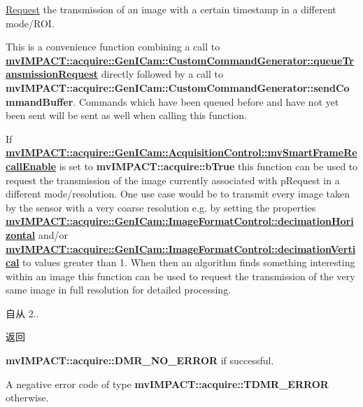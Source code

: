 \hyperlink{classmv_i_m_p_a_c_t_1_1acquire_1_1_request}{Request} the transmission of an image with a certain timestamp in a different mode/\+R\+O\+I. 

This is a convenience function combining a call to {\bfseries \hyperlink{classmv_i_m_p_a_c_t_1_1acquire_1_1_gen_i_cam_1_1_custom_command_generator_a807c3f7b8eb9b6392035e97967116250}{mv\+I\+M\+P\+A\+C\+T\+::acquire\+::\+Gen\+I\+Cam\+::\+Custom\+Command\+Generator\+::queue\+Transmission\+Request}} directly followed by a call to {\bfseries mv\+I\+M\+P\+A\+C\+T\+::acquire\+::\+Gen\+I\+Cam\+::\+Custom\+Command\+Generator\+::send\+Command\+Buffer}. Commands which have been queued before and have not yet been sent will be sent as well when calling this function.

If {\bfseries \hyperlink{classmv_i_m_p_a_c_t_1_1acquire_1_1_gen_i_cam_1_1_acquisition_control_aeb86056e3eb76d5c80c4048ac9ba10d5}{mv\+I\+M\+P\+A\+C\+T\+::acquire\+::\+Gen\+I\+Cam\+::\+Acquisition\+Control\+::mv\+Smart\+Frame\+Recall\+Enable}} is set to {\bfseries mv\+I\+M\+P\+A\+C\+T\+::acquire\+::b\+True} this function can be used to request the transmission of the image currently associated with {\ttfamily p\+Request} in a different mode/resolution. One use case would be to transmit every image taken by the sensor with a very coarse resolution e.\+g. by setting the properties {\bfseries \hyperlink{classmv_i_m_p_a_c_t_1_1acquire_1_1_gen_i_cam_1_1_image_format_control_af3c2ae5e5f9aaea7a762f3cd10ce1ebb}{mv\+I\+M\+P\+A\+C\+T\+::acquire\+::\+Gen\+I\+Cam\+::\+Image\+Format\+Control\+::decimation\+Horizontal}} and/or {\bfseries \hyperlink{classmv_i_m_p_a_c_t_1_1acquire_1_1_gen_i_cam_1_1_image_format_control_aee18567f6502e019607cab86903a68af}{mv\+I\+M\+P\+A\+C\+T\+::acquire\+::\+Gen\+I\+Cam\+::\+Image\+Format\+Control\+::decimation\+Vertical}} to values greater than 1. When then an algorithm finds something interesting within an image this function can be used to request the transmission of the very same image in full resolution for detailed processing.

\begin{DoxySince}{自从}
2.. 
\end{DoxySince}
\begin{DoxyReturn}{返回}

\begin{DoxyItemize}
\item {\bfseries mv\+I\+M\+P\+A\+C\+T\+::acquire\+::\+D\+M\+R\+\_\+\+N\+O\+\_\+\+E\+R\+R\+O\+R} if successful.
\item A negative error code of type {\bfseries mv\+I\+M\+P\+A\+C\+T\+::acquire\+::\+T\+D\+M\+R\+\_\+\+E\+R\+R\+O\+R} otherwise. 
\end{DoxyItemize}
\end{DoxyReturn}

